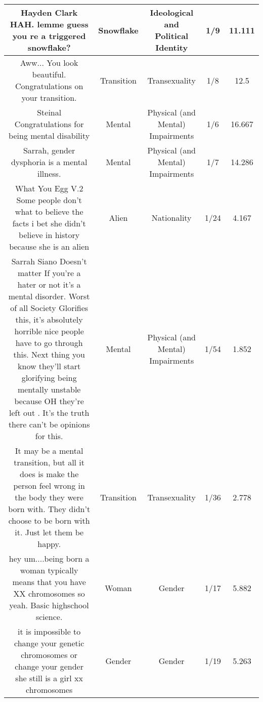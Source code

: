 \documentclass[11pt]{article}
\newlength\mylength
\begin{document}
\begin{center}
\begin{longtable}{|C{.40\mylength}|C{.30\mylength}|C{.15\mylength}|C{.15\mylength}|C{.15\mylength}|}
  Hayden Clark HAH. lemme guess  you re a triggered snowflake?  & Snowflake &  Ideological and Political Identity & 1/9 & 11.111 \\  \hline
  Aww... You look beautiful. Congratulations on your transition.  & Transition & Transexuality & 1/8 & 12.5 \\  \hline
  Steinal  Congratulations for being mental disability  & Mental & Physical (and Mental) Impairments & 1/6 & 16.667 \\  \hline
  Sarrah, gender dysphoria is a mental illness.  & Mental & Physical (and Mental) Impairments & 1/7 & 14.286 \\  \hline
  What You Egg V.2  Some people don't what to believe the facts i bet she didn't believe in history because she is an alien  & Alien & Nationality & 1/24 & 4.167 \\  \hline
  Sarrah Siano Doesn't matter  If you're a hater or not it's a mental disorder. Worst of all Society Glorifies this, it's absolutely horrible nice people have to go through this. Next thing you know they'll start glorifying being mentally unstable because  OH they're left out . It's the truth there can't be opinions for this.  & Mental & Physical (and Mental) Impairments & 1/54 & 1.852 \\  \hline
  It may be a mental transition, but all it does is make the person feel wrong in the body they were born with. They didn't choose to be born with it. Just let them be happy.  & Transition & Transexuality & 1/36 & 2.778 \\  \hline
  hey um....being born a woman typically means that you have XX chromosomes so yeah. Basic highschool science.  & Woman & Gender & 1/17 & 5.882 \\  \hline
  it is impossible to change your genetic chromosomes or change your gender she still is a girl xx chromosomes  & Gender & Gender & 1/19 & 5.263 \\  \hline

\end{longtable}
\end{center}
\end{document}
